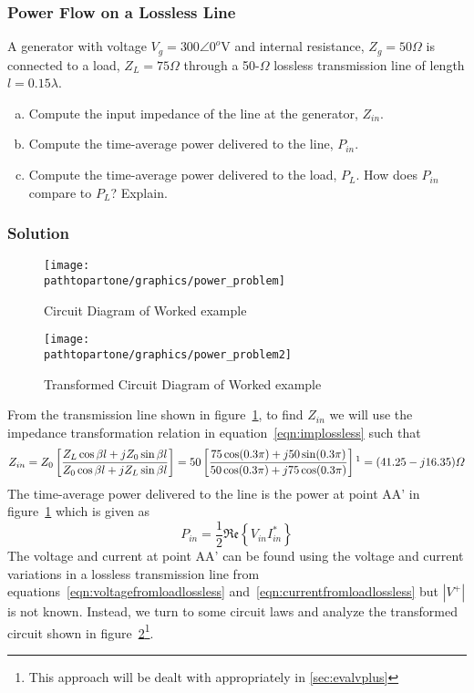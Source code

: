 \begin{exmp}
\subsubsection*{Power Flow on a Lossless Line}
A generator with voltage $V_g = 300\angle0^o$V and internal resistance, $Z_g = 50\varOmega$ is connected to a load, $Z_L = 75\varOmega$ through a 50-$\varOmega$ lossless transmission line of length $l = 0.15\lambda$.
\begin{enumerate}[(a)]
\item Compute the input impedance of the line at the generator, $Z_{in}$.
\item Compute the time-average power delivered to the line, $P_{in}$.
\item Compute the time-average power delivered to the load, $P_L$. How does $P_{in}$ compare to $P_L$? Explain.
\end{enumerate}

\subsubsection*{Solution}
\begin{figure}[h]
\centering
\texttt{[image: \\pathtopartone/graphics/power\_problem]}
\caption{Circuit Diagram of Worked example}
\label{fig:powerproblem}
\end{figure}
\begin{figure}[h]
\centering
\texttt{[image: \\pathtopartone/graphics/power\_problem2]}
\caption{Transformed Circuit Diagram of Worked example}
\label{fig:powerproblem2}
\end{figure}

From the transmission line shown in figure~\ref{fig:powerproblem}, to find $Z_{in}$ we will use the impedance transformation relation in equation~\eqref{eqn:implossless} such that
\begin{dmath*}
Z_{in} = Z_0\left[\frac{Z_L\cos\beta l + jZ_0\sin\beta l}{Z_0\cos\beta l + jZ_L\sin\beta l} \right]
= 50\left[\frac{75\cos(0.3\pi) + j50\sin(0.3\pi)}{50\cos(0.3\pi) + j75\cos(0.3\pi)} \right]\footnotemark
= (41.25 - j16.35)\varOmega
\end{dmath*}
The time-average power delivered to the line is the power at point AA' in figure~\ref{fig:powerproblem} which is given as
\begin{dmath*}
P_{in} = \frac{1}{2}\mathfrak{Re}\left\lbrace V_{in}I_{in}^*\right\rbrace
\end{dmath*}
The voltage and current at point AA' can be found using the voltage and current variations in a lossless transmission line from equations~\eqref{eqn:voltagefromloadlossless} and~\eqref{eqn:currentfromloadlossless} but $|V^+|$ is not known. Instead, we turn to some circuit laws and analyze the transformed circuit shown in figure~\ref{fig:powerproblem2}\footnote{This approach will be dealt with appropriately in \autoref{sec:evalvplus}}.


\end{exmp}
